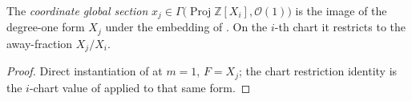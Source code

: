 \begin{definition}\leanok
  \label{def:coordinate_section}
  The \emph{coordinate global section} \(x_j \in \Gamma\bigl(
  \operatorname{Proj} \mathbb Z[X_i], \mathcal O(1)\bigr)\) is the image of
  the degree-one form \(X_j\) under the embedding of
  . On the \(i\)-th chart it restricts to
  the away-fraction \(X_j/X_i\).
\end{definition}
\begin{proof}\leanok
  Direct instantiation of  at
  \(m = 1\), \(F = X_j\); the chart restriction identity is the \(i\)-chart
  value of  applied to that same form.
\end{proof}

